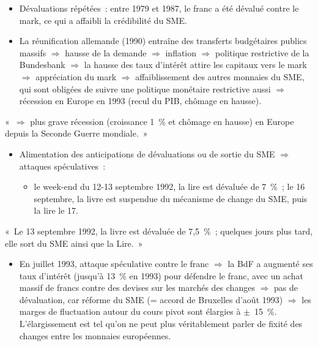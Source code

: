\begin{itemize}
  \item Dévaluations répétées~: entre 1979 et 1987, le franc a été dévalué contre le
    mark, ce qui a affaibli la crédibilité du SME.
  \item La réunification allemande (1990) entraîne des transferts budgétaires publics
    massifs $\Rightarrow$ hausse de la demande $\Rightarrow$ inflation $\Rightarrow$
    politique restrictive de la Bundesbank $\Rightarrow$ la hausse des taux d'intérêt
    attire les capitaux vers le mark $\Rightarrow$ appréciation du mark $\Rightarrow$
    affaiblissement des autres monnaies du SME, qui sont obligées de suivre une
    politique monétaire restrictive aussi $\Rightarrow$ récession en Europe en 1993
    (recul du PIB, chômage en hausse).
\end{itemize}

\begin{remark}
  «~$\Rightarrow$ plus grave récession (croissance 1~\% et chômage en hausse) en Europe
  depuis la Seconde Guerre mondiale.~»
\end{remark}

\begin{itemize}
  \item Alimentation des anticipations de dévaluations ou de sortie du SME
    $\Rightarrow$ attaques spéculatives~:
    \begin{itemize}
      \item le week-end du 12-13 septembre 1992, la lire est dévaluée de 7~\%~; le
        16 septembre, la livre est suspendue du mécanisme de change du SME, puis la lire
        le 17.
    \end{itemize}
\end{itemize}

\begin{remark}
  «~Le 13 septembre 1992, la livre est dévaluée de 7,5~\%~; quelques jours plus tard,
  elle sort du SME ainsi que la Lire.~»
\end{remark}

\begin{itemize}
  \item En juillet 1993, attaque spéculative contre le franc $\Rightarrow$ la BdF a
    augmenté ses taux d'intérêt (jusqu'à 13~\% en 1993) pour défendre le franc, avec un
    achat massif de francs contre des devises sur les marchés des changes $\Rightarrow$
    pas de dévaluation, car réforme du SME (= accord de Bruxelles d'août 1993)
    $\Rightarrow$ les marges de fluctuation autour du cours pivot sont élargies à
    $\pm$~15~\%. L'élargissement est tel qu'on ne peut plus véritablement parler de
    fixité des changes entre les monnaies européennes.
\end{itemize}


